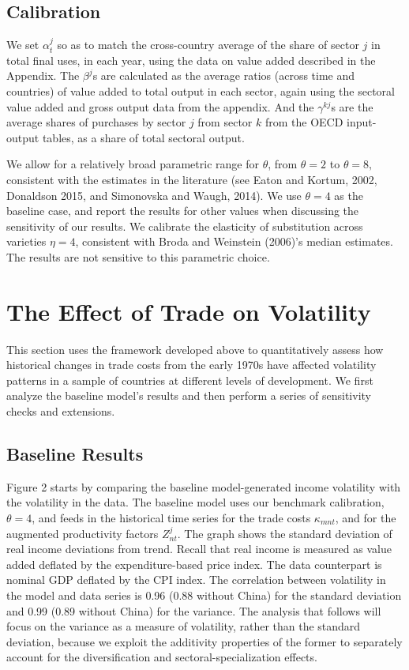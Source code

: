 \documentclass[12pt]{article}
\begin{document}
\subsection{Calibration}

We set $\alpha _{t}^{j}$ so as to match the cross-country average of the
share of sector $j$ in total final uses, in each year, using the data on
value added described in the Appendix. The $\beta ^{j}$s are calculated as
the average ratios (across time and countries) of value added to total
output in each sector, again using the sectoral value added and gross output
data from the appendix. And the $\gamma ^{kj}$s are the average shares of
purchases by sector $j$ from sector $k$ from the OECD input-output tables,
as a share of total sectoral output.

We allow for a relatively broad parametric range for $\theta $, from $\theta
=2$ to $\theta =8,$ consistent with the estimates in the literature (see
Eaton and Kortum, 2002, Donaldson 2015, and Simonovska and Waugh, 2014). We
use $\theta =4$ as the baseline case, and report the results for other
values when discussing the sensitivity of our results. We calibrate the
elasticity of substitution across varieties $\eta =4$, consistent with Broda
and Weinstein (2006)'s median estimates. The results are not sensitive to
this parametric choice.

\section{The Effect of Trade on Volatility}

This section uses the framework developed above to quantitatively assess how
historical changes in trade costs from the early 1970s have affected
volatility patterns in a sample of countries at different levels of
development. We first analyze the baseline model's results and then perform
a series of sensitivity checks and extensions.

\subsection{Baseline Results}

Figure 2 starts by comparing the baseline model-generated income volatility
with the volatility in the data. The baseline model uses our benchmark
calibration, $\theta =4$, and feeds in the historical time series for the
trade costs $\kappa _{mnt}$, and for the augmented productivity factors $%
Z_{nt}^{j}$. The graph shows the standard deviation of real income
deviations from trend. Recall that real income is measured as value added
deflated by the expenditure-based price index. The data counterpart is
nominal GDP deflated by the CPI index. The correlation between volatility in the model and data series is 0.96 (0.88 without China) for the
standard deviation and 0.99 (0.89 without China) for the variance. The
analysis that follows will focus on the variance as a measure of volatility,
rather than the standard deviation, because we exploit the additivity
properties of the former to separately account for the diversification and
sectoral-specialization effects.
\end{document}
